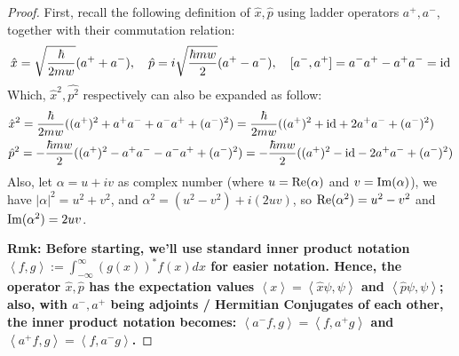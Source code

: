 \documentclass{article}
\begin{document}
\begin{proof}
    
    First, recall the following definition of $\hat{x},\hat{p}$ using ladder operators $a^+,a^-$, together with their commutation relation:
    \begin{align}
        \hat{x}=\sqrt{\frac{\hbar}{2mw}}(a^++a^-),\quad \hat{p}=i\sqrt{\frac{\hbar mw}{2}}(a^+-a^-),\quad [a^-,a^+]=a^-a^+-a^+a^- = \mathrm{id}
    \end{align}
    Which, $\hat{x}^2,\hat{p^2}$ respectively can also be expanded as follow:
    \begin{align}
        &\hat{x}^2 = \frac{\hbar}{2mw}((a^+)^2+a^+a^-+a^-a^++(a^-)^2) = \frac{\hbar}{2mw}((a^+)^2+\mathrm{id}+2a^+a^-+(a^-)^2)\\
        &\hat{p}^2 = -\frac{\hbar mw}{2}((a^+)^2-a^+a^--a^-a^++(a^-)^2) = -\frac{\hbar mw}{2}((a^+)^2-\mathrm{id}-2a^+a^-+(a^-)^2)
    \end{align}
    Also, let $\alpha=u+iv$ as complex number (where $u=\mathrm{Re}(\alpha)$ and $v=\mathrm{Im}(\alpha)$), we have $|\alpha|^2 = u^2+v^2$, and $\alpha^2=(u^2-v^2)+i(2uv)$, so $\mathrm{Re}(\alpha^2)=u^2-v^2$ and $\mathrm{Im}(\alpha^2)=2uv$.

    \textbf{Rmk: Before starting, we'll use standard inner product notation $\left<f,g\right>:= \int_{-\infty}^{\infty}(g(x))^* f(x)dx$ for easier notation. Hence, the operator $\hat{x},\hat{p}$ has the expectation values $\left<x\right>=\left<\hat{x}\psi,\psi\right>$ and $\left<\hat{p}\psi,\psi\right>$; also, with $a^-,a^+$ being adjoints / Hermitian Conjugates of each other, the inner product notation becomes: $\left<a^- f, g\right>=\left<f,a^+ g\right>$ and $\left<a^+f, g\right>=\left<f,a^-g\right>$.}


\end{proof}
\end{document}
